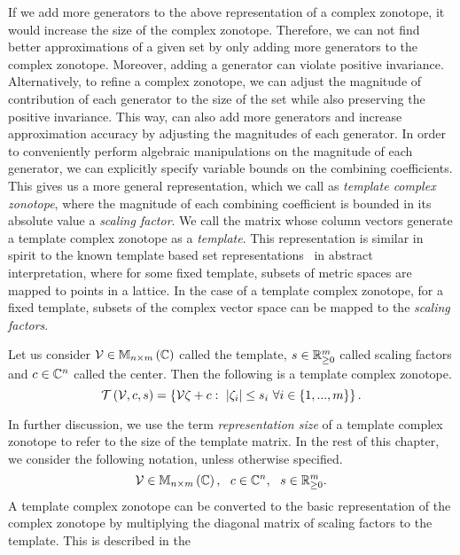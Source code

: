 If we add more generators to the above representation of a complex
zonotope, it would increase the size of the complex zonotope.
Therefore, we can not find better approximations of a given set by
only adding more generators to the complex zonotope.  Moreover, adding
a generator can violate positive invariance.  Alternatively, to refine
a complex zonotope, we can adjust the magnitude of contribution of
each generator to the size of the set while also preserving the
positive invariance.  This way, can also add more generators and
increase approximation accuracy by adjusting the magnitudes of each
generator.  In order to conveniently perform algebraic manipulations
on the magnitude of each generator, we can explicitly specify variable
bounds on the combining coefficients.  This gives us a more general
representation, which we call as {\it template complex zonotope},
where the magnitude of each combining coefficient is bounded in its
absolute value a {\it scaling factor}.  We call the matrix whose
column vectors generate a template complex zonotope as a {\it
template}.  This representation is similar in spirit to the known
template based set
representations~\cite{Sankaranarayanan+Dang+Ivancic-08-Symbolic,DBLP:journals/lisp/Mine06}
in abstract interpretation, where for some fixed template, subsets of
metric spaces are mapped to points in a lattice.  In the case of a
template complex zonotope, for a fixed template, subsets of the
complex vector space can be mapped to the {\it scaling factors}.
%
\begin{definition}
Let us consider ${\mathcal{V}\in\mathbb{M}_{n\times m}\left(\mathbb{C}\right)}$ called the template,
${s\in\mathbb{R}^m_{\geq 0}}$ called scaling factors and
${c\in\mathbb{C}^n}$ called the center.  Then the following is a template
complex zonotope.
%
\begin{equation}
\mathit{\operatorname{\mathcal{T}}}\left(\mathcal{V},c,s\right)
= \left\{\mathcal{V}\zeta+c:~\left|\zeta_i\right|\leq s_i~\forall
i\in\left\{1,...,m\right\}\right\}.
\end{equation}
\end{definition}
In further discussion, we use the term {\it representation size} of a
template complex zonotope to refer to the size of the template matrix.
In the rest of this chapter, we consider the following notation,
unless otherwise specified.
%
\[
\mathcal{V}\in\mathbb{M}_{n\times m}\left(\mathbb{C}\right),~~c\in\mathbb{C}^n,~~s\in\mathbb{R}^m_{\geq 0}.
\]
%
A template complex zonotope can be converted to the basic
representation of the complex zonotope by multiplying the diagonal
matrix of scaling factors to the template.  This is described in the

